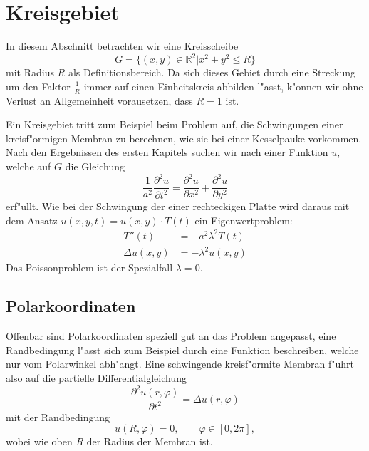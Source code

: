 \section{Kreisgebiet}
In diesem Abschnitt betrachten wir eine Kreisscheibe
\[
G=\{(x,y)\in\mathbb R^2|x^2+y^2\le R\}
\]
mit Radius $R$ als Definitionsbereich. Da sich dieses Gebiet durch
eine Streckung um den Faktor $\frac1R$ immer auf einen Einheitskreis
abbilden l"asst, k"onnen wir ohne Verlust an Allgemeinheit vorausetzen,
dass $R=1$ ist.

Ein Kreisgebiet tritt zum Beispiel beim Problem auf, die Schwingungen
einer kreisf"ormigen Membran zu berechnen, wie sie bei einer Kesselpauke
vorkommen. Nach den Ergebnissen des ersten Kapitels suchen wir nach einer
Funktion $u$, welche auf $G$ die Gleichung
\[
\frac1{a^2}\frac{\partial^2 u}{\partial t^2}=\frac{\partial^2 u}{\partial x^2}+\frac{\partial^2 u}{\partial y^2}
\]
erf"ullt. Wie bei der Schwingung der einer rechteckigen Platte
wird daraus mit dem Ansatz $ u(x,y,t)=u(x,y)\cdot T(t)$ ein
Eigenwertproblem:
\begin{align*}
T''(t)&=-a^2\lambda^2 T(t)\\
\Delta u(x,y)&=-\lambda^2u(x,y)
\end{align*}
Das Poissonproblem ist der Spezialfall $\lambda=0$.

\subsection{Polarkoordinaten}
Offenbar sind Polarkoordinaten speziell gut an das Problem angepasst, 
eine Randbedingung l"asst sich zum Beispiel durch eine Funktion beschreiben,
welche nur vom Polarwinkel abh"angt.
Eine schwingende kreisf"ormite Membran f"uhrt also auf die partielle
Differentialgleichung
\[
\frac{\partial^2u(r,\varphi)}{\partial t^2}=\Delta u(r,\varphi)
\]
mit der Randbedingung
\[
u(R,\varphi)=0,\qquad\varphi\in[0,2\pi],
\]
wobei wie oben $R$ der Radius der Membran ist.

